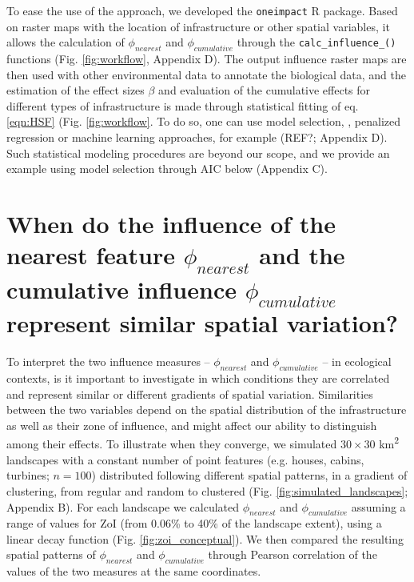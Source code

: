 \documentclass[titlepage]{article}
\begin{document}
{To ease the use of the approach, we developed the \verb|oneimpact| R package. Based on raster maps with the location of infrastructure or other spatial variables, it allows the calculation of $\phi_{nearest}$ and $\phi_{cumulative}$ through the \verb|calc_influence_()| functions (Fig. \ref{fig:workflow}, Appendix D). The output influence raster maps are then used with other environmental data to annotate the biological data, and the estimation of the effect sizes $\beta$ and evaluation of the cumulative effects for different types of infrastructure is made through statistical fitting of eq. \ref{eqn:HSF} (Fig. \ref{fig:workflow}. To do so, one can use model selection, \citep{burnham_model_2002}, penalized regression \citep{lee_estimating_2020} or machine learning approaches, for example (REF?; Appendix D). Such statistical modeling procedures are beyond our scope, and we provide an example using model selection through AIC below (Appendix C).   

\section{When do the influence of the nearest feature $\phi_{nearest}$ and the cumulative influence $\phi_{cumulative}$ represent similar spatial variation?}

To interpret the two influence measures -- $\phi_{nearest}$ and $\phi_{cumulative}$ -- in ecological contexts, is it important to investigate in which conditions they are correlated and represent similar or different gradients of spatial variation. Similarities between the two variables depend on the spatial distribution of the infrastructure as well as their zone of influence, and might affect our ability to distinguish among their effects. To illustrate when they converge, we simulated $30 \times 30$ km\textsuperscript{2} landscapes with a constant number of point features (e.g. houses, cabins, turbines; $n = 100$) distributed following different spatial patterns, in a gradient of clustering, from regular and random to clustered (Fig. \ref{fig:simulated_landscapes}; Appendix B). For each landscape we calculated $\phi_{nearest}$ and $\phi_{cumulative}$ assuming a range of values for ZoI (from 0.06\% to 40\% of the landscape extent), using a linear decay function (Fig. \ref{fig:zoi_conceptual}). We then compared the resulting spatial patterns of $\phi_{nearest}$ and $\phi_{cumulative}$ through Pearson correlation of the values of the two measures at the same coordinates. 

}
\end{document}
